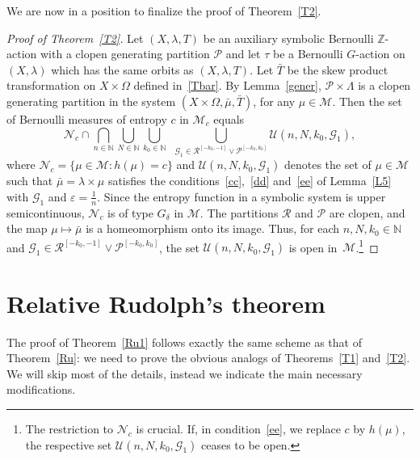 \documentclass{amsart}
\theoremstyle{remark}
\def \N {\mathbb N}
\def \Z {\mathbb Z}
\def \R {\mathcal R}
\def \G {\mathcal G}
\def \M {\mathcal M}
\def \U {\mathcal U}
\def \P {\mathcal P}
\def \eps {\varepsilon}
\begin{document}
We are now in a position to finalize the proof of Theorem~\ref{T2}.
\begin{proof}[Proof of Theorem~\ref{T2}] Let $(X,\lambda,T)$ be an auxiliary symbolic Bernoulli $\Z$-action with a clopen generating partition $\P$ and let $\tau$ be a Bernoulli $G$-action on $(X,\lambda)$ which has the same orbits as $(X,\lambda,T)$. 
Let $\bar T$ be the skew product transformation on $X\times\Omega$ defined in~\eqref{Tbar}. By Lemma~\ref{gener}, $\P\times\Lambda$ is a clopen generating partition in the system $(X\times\Omega,\bar\mu,\bar T)$, for any $\mu\in\M$.
Then the set of Bernoulli measures of entropy $c$ in $\M_c$ equals 
$$
\mathcal N_c\cap\bigcap_{n\in\N}\bigcup_{N\in\N}\bigcup_{k_0\in\N}\ \ \bigcup_{\G_1\in\R^{[-k_0,-1]}\vee\P^{[-k_0,k_0]}}\U(n,N,k_0,\G_1),
$$
where $\mathcal N_c=\{\mu\in\M: h(\mu)=c\}$ and $\U(n,N,k_0,\G_1)$ denotes the set of $\mu\in\M$ such that $\bar\mu=\lambda\times\mu$ satisfies the conditions~\eqref{cc},~\eqref{dd} and~\eqref{ee} of Lemma~\ref{L5} with $\G_1$ and $\eps=\frac1n$. Since the entropy function in a symbolic system is upper semicontinuous, $\mathcal N_c$ is of type $G_\delta$ in $\M$. The partitions $\R$ and $\P$ are clopen, and the map $\mu\mapsto\bar\mu$ is a homeomorphism onto its image. Thus, for each $n,N,k_0\in\N$ and $\G_1\in\R^{[-k_0,-1]}\vee\P^{[-k_0,k_0]}$, the set $\U(n,N,k_0,\G_1)$ is open in~$\M$.\footnote{The restriction to $\mathcal N_c$ is crucial. If, in condition~\eqref{ee}, we replace $c$ by $h(\mu)$, the respective set $\U(n,N,k_0,\G_1)$ ceases to be open.}
\end{proof}

\section{Relative Rudolph's theorem}\label{S5}

The proof of Theorem~\ref{Ru1} follows exactly the same scheme as that of Theorem~\ref{Ru}: we need to prove the obvious analogs of 
Theorems~\ref{T1} and~\ref{T2}. We will skip most of the details, instead we indicate the main necessary modifications. 
\end{document}
